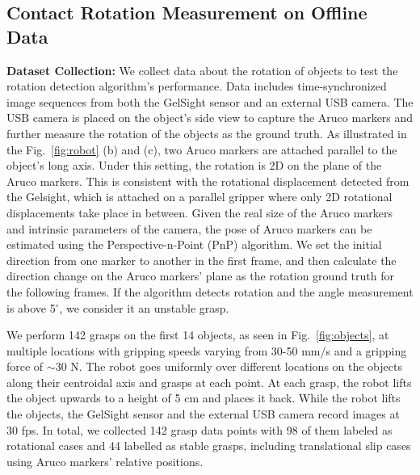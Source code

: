 \subsection{Contact Rotation Measurement on Offline Data}
\textbf{Dataset Collection: } 
We collect data about the rotation of objects to test the rotation detection algorithm's performance. Data includes time-synchronized image sequences from both the GelSight sensor and an external USB camera. The USB camera is placed on the object's side view to capture the Aruco markers and further measure the rotation of the objects as the ground truth. As illustrated in the Fig.~\ref{fig:robot} (b) and (c), two Aruco markers are attached parallel to the object's long axis. Under this setting, the rotation is 2D on the plane of the Aruco markers. This is consistent with the rotational displacement detected from the Gelsight, which is attached on a parallel gripper where only 2D rotational displacements take place in between. Given the real size of the Aruco markers and intrinsic parameters of the camera, the pose of Aruco markers can be estimated using the Perspective-n-Point (PnP) algorithm. We set the initial direction from one marker to another in the first frame, and then calculate the direction change on the Aruco markers' plane as the rotation ground truth for the following frames.
If the algorithm detects rotation and the angle measurement is above 5$^{\circ}$, we consider it an unstable grasp.

We perform 142 grasps on the first 14 objects, as seen in Fig.~\ref{fig:objects}, at multiple locations with gripping speeds varying from 30-50 mm/s and a gripping force of $\sim$30 N. The robot goes uniformly over different locations on the objects along their centroidal axis and grasps at each point. At each grasp, the robot lifts the object upwards to a height of 5 cm and places it back. While the robot lifts the objects, the GelSight sensor and the external USB camera record images at 30 fps. 
In total, we collected 142 grasp data points with 98 of them labeled as rotational cases and 44 labelled as stable grasps, including translational slip cases using Aruco markers' relative positions. 


